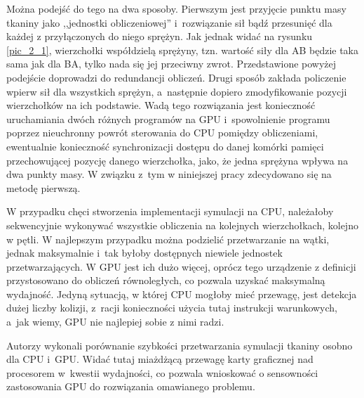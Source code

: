 		Można podejść do tego na dwa sposoby. Pierwszym jest przyjęcie punktu masy tkaniny jako ,,jednostki obliczeniowej'' i~rozwiązanie sił bądź przesunięć dla każdej z przyłączonych do niego sprężyn. Jak jednak widać na rysunku \ref{pic_2_1}, wierzchołki współdzielą sprężyny, tzn. wartość siły dla AB będzie taka sama jak dla BA, tylko nada się jej przeciwny zwrot. Przedstawione powyżej podejście doprowadzi do redundancji obliczeń. Drugi sposób zakłada policzenie wpierw sił dla wszystkich sprężyn, a~następnie dopiero zmodyfikowanie pozycji wierzchołków na ich podstawie. Wadą tego rozwiązania jest konieczność uruchamiania dwóch różnych programów na GPU i~spowolnienie programu poprzez nieuchronny powrót sterowania do CPU pomiędzy obliczeniami, ewentualnie konieczność synchronizacji dostępu do danej komórki pamięci przechowującej pozycję danego wierzchołka, jako, że jedna sprężyna wpływa na dwa punkty masy. W związku z~tym w niniejszej pracy zdecydowano się na metodę pierwszą.
		
		W przypadku chęci stworzenia implementacji symulacji na CPU, należałoby sekwencyjnie wykonywać wszystkie obliczenia na kolejnych wierzchołkach, kolejno w pętli. W najlepszym przypadku można podzielić przetwarzanie na wątki, jednak maksymalnie i~tak byłoby dostępnych niewiele jednostek przetwarzających. W GPU jest ich dużo więcej, oprócz tego urządzenie z definicji przystosowano do obliczeń równoległych, co pozwala uzyskać maksymalną wydajność. Jedyną sytuacją, w której CPU mogłoby mieć przewagę, jest detekcja dużej liczby kolizji, z~racji konieczności użycia tutaj instrukcji warunkowych, a~jak wiemy, GPU nie najlepiej sobie z nimi radzi.
		
		
		Autorzy \cite{deformable} wykonali porównanie szybkości przetwarzania symulacji tkaniny osobno dla CPU i~GPU. Widać tutaj miażdżącą przewagę karty graficznej nad procesorem w~kwestii wydajności, co pozwala wnioskować o sensowności zastosowania GPU do rozwiązania omawianego problemu.

